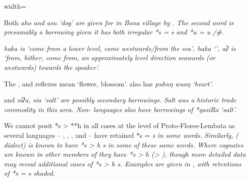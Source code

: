 \begin{table}
\begin{adjustbox}{width=\textwidth}
\begin{threeparttable}
		\begin{tablenotes}\tnsize
			\item[†]	{Both \it{aho}
								and \it{asu} ‘dog’ are given for  in Bana village by \citet{Sulistyono2018}.
								The second word is presumably a borrowing given it has both irregular
								*s = \it{s} and *u = \it{u} /{\gap}{\#}.}
			\item[‡]	{ \it{haka} is ‘come from a lower level,
								come westwards/from the sea’,
								 \it{haka} ‘’,
								 \it{aʔ} is ‘from,
								hither, come from, an approximately level direction seawards
								(or westwards) towards the speaker’.}
			\item[Δ]	{The ,
								 and  reflexes mean ‘flower, blossom’.
								 also has \it{puhuŋ wuaŋ} ‘heart’.}
			\item[{ǁ}]	{
								and  \it{siʔa, sia} ‘salt’ are possibly secondary borrowings.
								Salt was a historic trade commodity in this area.
								Non-  languages
								also have borrowings of *qasiRa ‘salt’.}
		\end{tablenotes}
	\end{threeparttable}
\end{adjustbox}
\end{table}

We cannot posit *s > **h in all cases at the level of Proto-Flores-Lembata
as several  languages -- ,
, , and  -- have retained *s = \it{s} in some words.
Similarly,   ( dialect) is known
to have *s > \it{h {\tl} s} in some of these same words.
Where cognates are known in other members of 
they have *s > \it{h} (> {\0}),
though more detailed data may reveal additional cases of *s > \it{h {\tl} s}.
Examples are given in ,
with retentions of *s = \it{s} shaded.

